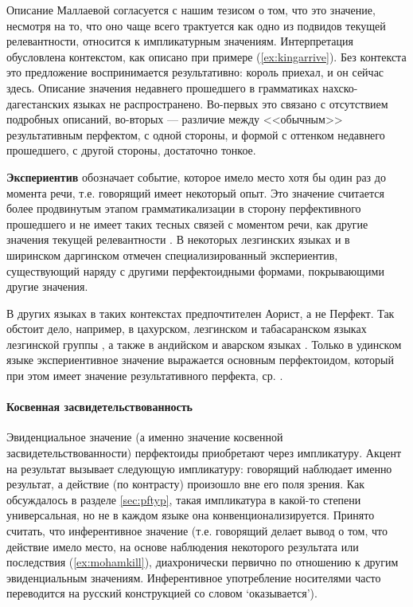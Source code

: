 Описание Маллаевой согласуется с нашим тезисом о том, что это значение, несмотря на то, что оно чаще всего трактуется как одно из подвидов текущей релевантности, относится к импликатурным значениям. Интерпретация обусловлена контекстом, как описано при примере (\ref{ex:kingarrive}). Без контекста это предложение воспринимается результативно: король приехал, и он сейчас здесь. Описание значения недавнего прошедшего в грамматиках нахско-дагестанских языках не распространено. Во-первых это связано с отсутствием подробных описаний, во-вторых --- различие между <<обычным>> результативным перфектом, с одной стороны, и формой с оттенком недавнего прошедшего, с другой стороны, достаточно тонкое.
\par \textbf{Экспериентив} обозначает событие, которое имело место хотя бы один раз до момента речи, т.е. говорящий имеет некоторый опыт. Это значение считается более продвинутым этапом грамматикализации в сторону перфективного прошедшего и не имеет таких тесных связей с моментом речи, как другие значения текущей релевантности \citep{lindstedt2000}. В некоторых лезгинских языках \citep{maisaklezgpf} и в ширинском даргинском \citep{belyaev2018} отмечен специализированный экспериентив, существующий наряду с другими перфектоидными формами, покрывающими другие значения.


В других языках в таких контекстах предпочтителен Аорист, а не Перфект. Так обстоит дело, например, в цахурском, лезгинском и табасаранском языках лезгинской группы \citep{maisaklezgpf}, а также в андийском и аварском языках \citep{verhees2018}. Только в удинском языке экспериентивное значение выражается основным перфектоидом, который при этом имеет значение результативного перфекта, ср. \citep{maisak2018}.

\paragraph{Косвенная засвидетельствованность} \label{sec:semevid}

Эвиденциальное значение (а именно значение косвенной засвидетельствованности) перфектоиды приобретают через импликатуру. Акцент на результат вызывает следующую импликатуру: говорящий наблюдает именно результат, а действие (по контрасту) произошло вне его поля зрения. Как обсуждалось в разделе \ref{sec:pftyp}, такая импликатура в какой-то степени универсальная, но не в каждом языке она конвенционализируется. Принято считать, что инферентивное значение (т.е. говорящий делает вывод о том, что действие имело место, на основе наблюдения некоторого результата или последствия (\ref{ex:mohamkill}), диахронически первично по отношению к другим эвиденциальным значениям. Инферентивное употребление носителями часто переводится на русский конструкцией со словом `оказывается').

